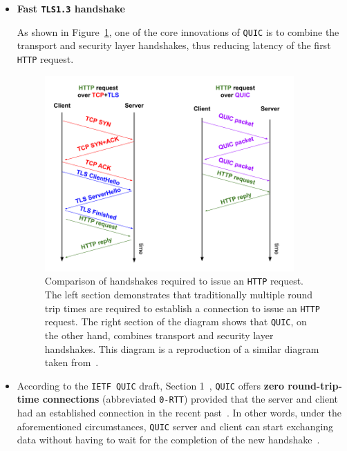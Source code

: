 \documentclass[12pt,a4paper,twoside,openright]{report}
\begin{document}
\begin{itemize}
\item \textbf{Fast \texttt{TLS1.3} handshake}

As shown in Figure~\ref{fig:QUIC_handshake_vs_TCP-TLS_handshake}, one of the core innovations of \texttt{QUIC} is to combine the transport and security layer handshakes, thus reducing latency of the first \texttt{HTTP} request.


     \begin{figure}[H]
    \centering
    \includegraphics[width=0.9\textwidth]{figs/QUIC_handshake_vs_TCP-TLS_handshake.png}
    \caption[Comparison of handshakes required to issue an \texttt{HTTP} request]{Comparison of handshakes required to issue an \texttt{HTTP} request. The left section demonstrates that traditionally multiple round trip times are required to establish a connection to issue an \texttt{HTTP} request. The right section of the diagram shows that \texttt{QUIC}, on the other hand, combines transport and security layer handshakes. This diagram is a reproduction of a similar diagram taken from~\cite{the-road-to-quic}.}
    \label{fig:QUIC_handshake_vs_TCP-TLS_handshake}
    \end{figure}
 
 

  \item 
    According to the \texttt{IETF QUIC} draft, Section 1~\cite{ietf-quic-transport-draft-32}, \texttt{QUIC} offers \textbf{zero round-trip-time connections} (abbreviated \texttt{0-RTT}) provided that the server and client had an established connection in the recent past~\cite{introducing-0-rtt}.
    In other words, under the aforementioned circumstances, \texttt{QUIC} server and client can start exchanging data without having to wait for the completion of the new handshake~\cite{ietf-quic-transport-draft-32}.
  

\end{itemize}
\end{document}
